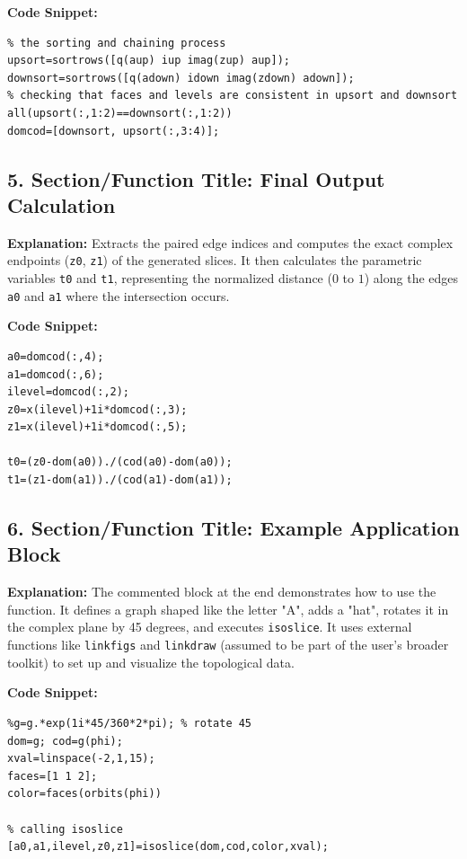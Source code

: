 \textbf{Code Snippet:}
\begin{lstlisting}
% the sorting and chaining process
upsort=sortrows([q(aup) iup imag(zup) aup]);
downsort=sortrows([q(adown) idown imag(zdown) adown]);
% checking that faces and levels are consistent in upsort and downsort
all(upsort(:,1:2)==downsort(:,1:2))
domcod=[downsort, upsort(:,3:4)];
\end{lstlisting}

\subsection*{5. Section/Function Title: Final Output Calculation}
\textbf{Explanation:} Extracts the paired edge indices and computes the exact complex endpoints (\texttt{z0}, \texttt{z1}) of the generated slices. It then calculates the parametric variables \texttt{t0} and \texttt{t1}, representing the normalized distance ($0$ to $1$) along the edges \texttt{a0} and \texttt{a1} where the intersection occurs.

\textbf{Code Snippet:}
\begin{lstlisting}
a0=domcod(:,4);
a1=domcod(:,6);
ilevel=domcod(:,2);
z0=x(ilevel)+1i*domcod(:,3);
z1=x(ilevel)+1i*domcod(:,5);

t0=(z0-dom(a0))./(cod(a0)-dom(a0));
t1=(z1-dom(a1))./(cod(a1)-dom(a1));
\end{lstlisting}

\subsection*{6. Section/Function Title: Example Application Block}
\textbf{Explanation:} The commented block at the end demonstrates how to use the function. It defines a graph shaped like the letter "A", adds a "hat", rotates it in the complex plane by 45 degrees, and executes \texttt{isoslice}. It uses external functions like \texttt{linkfigs} and \texttt{linkdraw} (assumed to be part of the user's broader toolkit) to set up and visualize the topological data.

\textbf{Code Snippet:}
\begin{lstlisting}
%g=g.*exp(1i*45/360*2*pi); % rotate 45
dom=g; cod=g(phi);
xval=linspace(-2,1,15);
faces=[1 1 2];
color=faces(orbits(phi))

% calling isoslice
[a0,a1,ilevel,z0,z1]=isoslice(dom,cod,color,xval);
\end{lstlisting}

